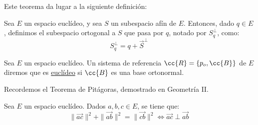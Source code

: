 Este teorema da lugar a la siguiente definición:
\begin{definicion}
    Sea $E$ un espacio euclídeo, y sea $S$ un subespacio afín de $E$. Entonces, dado $q\in E$, definimos el subespacio ortogonal a $S$ que pasa por $q$, notado por $S^\perp_q$, como:
    $$S^\perp_q = q+\vec{S}^\perp$$
\end{definicion}



\begin{definicion}
    Sea $E$ un espacio euclídeo. Un sistema de referencia $\cc{R}=\{p_o,\cc{B}\}$ de $E$ diremos que es \ul{euclídeo} si $\cc{B}$ es una base ortonormal.
\end{definicion}

Recordemos el Teorema de Pitágoras, demostrado en Geometría II.
\begin{teo}[de Pitágoras]
    Sea $E$ un espacio euclídeo. Dados $a,b,c\in E$, se tiene que:
    \begin{equation*}
        \|\vec{ac}\|^2 + \|\vec{ab}\|^2 = \|\vec{cb}\|^2 \Longleftrightarrow \vec{ac}\perp \vec{ab}
    \end{equation*}
    \begin{figure}[H]
        \centering
    \end{figure}
\end{teo}



